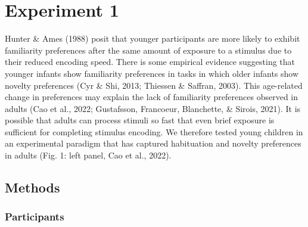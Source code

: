 \documentclass[10pt, letterpaper]{article}
\begin{document}
\hypertarget{experiment-1}{%
\section{Experiment 1}\label{experiment-1}}

Hunter \& Ames (1988) posit that younger participants are more likely to
exhibit familiarity preferences after the same amount of exposure to a
stimulus due to their reduced encoding speed. There is some empirical
evidence suggesting that younger infants show familiarity preferences in
tasks in which older infants show novelty preferences (Cyr \& Shi, 2013;
Thiessen \& Saffran, 2003). This age-related change in preferences may
explain the lack of familiarity preferences observed in adults (Cao et
al., 2022; Gustafsson, Francoeur, Blanchette, \& Sirois, 2021). It is
possible that adults can process stimuli so fast that even brief
exposure is sufficient for completing stimulus encoding. We therefore
tested young children in an experimental paradigm that has captured
habituation and novelty preferences in adults (Fig. 1: left panel, Cao
et al., 2022).

\hypertarget{methods}{%
\subsection{Methods}\label{methods}}

\hypertarget{participants}{%
\subsubsection{Participants}\label{participants}}

\captionsetup{belowskip=0pt,aboveskip=0pt}
\end{document}
